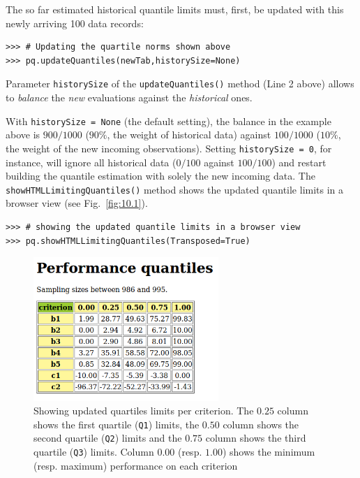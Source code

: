 The so far estimated historical quantile limits must, first, be updated with this newly arriving 100 data records:
\begin{lstlisting}
>>> # Updating the quartile norms shown above 
>>> pq.updateQuantiles(newTab,historySize=None)
\end{lstlisting}
Parameter \texttt{historySize} of the \texttt{updateQuantiles()} method (Line 2 above) allows to \emph{balance} the \emph{new} evaluations against the \emph{historical} ones.

With \texttt{historySize = None} (the default setting), the balance in the example above is $900/1000$ ($90\%$, the weight of historical data) against $100/1000$ ($10\%$, the weight of the new incoming observations). Setting \texttt{historySize = 0}, for instance, will ignore all historical data ($0/100$ against $100/100$) and restart building the quantile estimation with solely the new incoming data. The \texttt{showHTMLLimitingQuantiles()} method shows the updated quantile limits in a browser view (see Fig.~\vref{fig:10.1}).
\begin{lstlisting}
>>> # showing the updated quantile limits in a browser view
>>> pq.showHTMLLimitingQuantiles(Transposed=True)
\end{lstlisting}
\begin{figure}[ht]
\sidecaption[t]
\includegraphics[width=7cm]{Figures/10-1-examplePerfQuantiles.png}
\caption[Showing updated quartiles limits per criterion]{Showing updated quartiles limits per criterion. The $0.25$ column shows the first quartile (\texttt{Q1}) limits, the $0.50$ column shows the second quartile (\texttt{Q2}) limits and the $0.75$ column shows the third quartile (\texttt{Q3}) limits. Column $0.00$ (resp. $1.00$) shows the minimum (resp. maximum) performance on each criterion}
\label{fig:10.1}       %
\end{figure}
    
